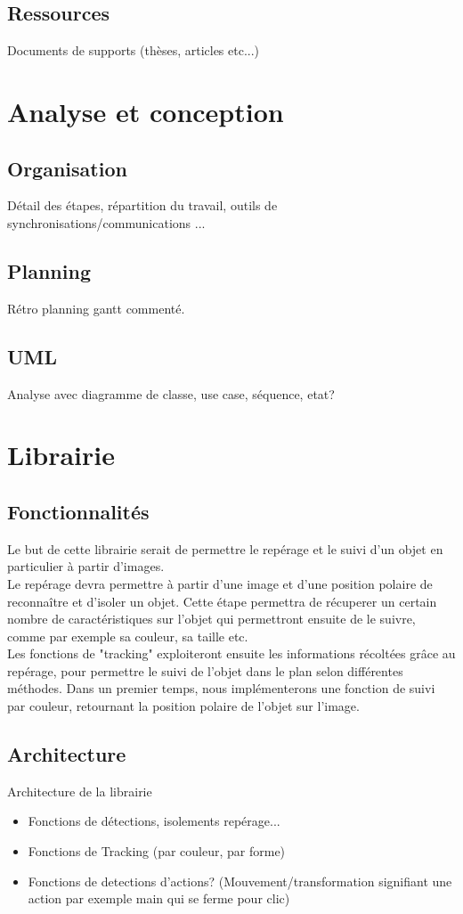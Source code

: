 \documentclass{article}
\begin{document}
		\subsection{Ressources}
			Documents de supports (thèses, articles etc...)
	\section{Analyse et conception}
		\subsection{Organisation}
			Détail des étapes, répartition du travail, outils de synchronisations/communications ...
		\subsection{Planning}
			Rétro planning gantt commenté.
		\subsection{UML}
			Analyse avec diagramme de classe, use case, séquence, etat?
\newpage
	\section{Librairie}
		\subsection{Fonctionnalités}
			Le but de cette librairie serait de permettre le repérage et le suivi d'un objet en particulier à partir d'images. \\
			Le repérage devra permettre à partir d'une image et d'une position polaire de reconnaître et d'isoler un objet. Cette étape permettra de récuperer un certain nombre de caractéristiques sur l'objet qui permettront ensuite de le suivre, comme par exemple sa couleur, sa taille etc. \\
			Les fonctions de "tracking" exploiteront ensuite les informations récoltées grâce au repérage, pour permettre le suivi de l'objet dans le plan selon différentes méthodes.
Dans un premier temps, nous implémenterons une fonction de suivi par couleur, retournant la position polaire de l'objet sur l'image. \\ 
		\subsection{Architecture}
			Architecture de la librairie 
			\begin{itemize}
			\item Fonctions de détections, isolements repérage...
			\item Fonctions de Tracking (par couleur, par forme)
			\item Fonctions de detections d'actions? (Mouvement/transformation signifiant une action par exemple main qui se ferme pour clic)
			\end{itemize}
\end{document}
